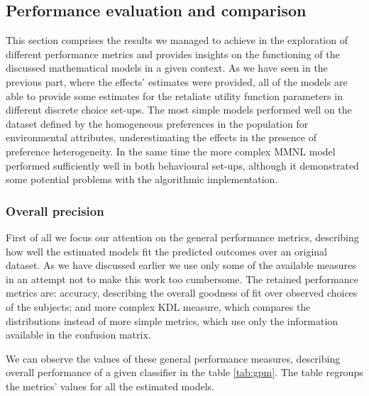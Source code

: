 \documentclass[12pt,]{article}
\begin{document}
\FloatBarrier

\hypertarget{performance-evaluation-and-comparison}{%
\subsection{Performance evaluation and
comparison}\label{performance-evaluation-and-comparison}}

This section comprises the results we managed to achieve in the
exploration of different performance metrics and provides insights on
the functioning of the discussed mathematical models in a given context.
As we have seen in the previous part, where the effects' estimates were
provided, all of the models are able to provide some estimates for the
retaliate utility function parameters in different discrete choice
set-ups. The most simple models performed well on the dataset defined by
the homogeneous preferences in the population for environmental
attributes, underestimating the effects in the presence of preference
heterogeneity. In the same time the more complex MMNL model performed
sufficiently well in both behavioural set-ups, although it demonstrated
some potential problems with the algorithmic implementation.

\hypertarget{overall-precision}{%
\subsubsection{Overall precision}\label{overall-precision}}

\FloatBarrier

First of all we focus our attention on the general performance metrics,
describing how well the estimated models fit the predicted outcomes over
an original dataset. As we have discussed earlier we use only some of
the available measures in an attempt not to make this work too
cumbersome. The retained performance metrics are: accuracy, describing
the overall goodness of fit over observed choices of the subjects; and
more complex KDL measure, which compares the distributions instead of
more simple metrics, which use only the information available in the
confusion matrix.

We can observe the values of these general performance measures,
describing overall performance of a given classifier in the table
\ref{tab:gpm}. The table regroups the metrics' values for all the
estimated models.
\end{document}
